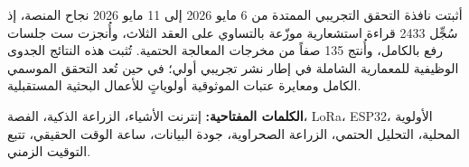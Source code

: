 \begin{Arabic}
أثبتت نافذة التحقق التجريبي الممتدة من 6 مايو 2026 إلى 11 مايو 2026 نجاح
المنصة، إذ سُجِّل 2433 قراءة استشعارية موزّعة بالتساوي على العقد الثلاث، وأُنجزت
ست جلسات رفع بالكامل، وأُنتج 135 صفاً من مخرجات المعالجة الحتمية. تُثبت هذه
النتائج الجدوى الوظيفية للمعمارية الشاملة في إطار نشر تجريبي أولي؛ في حين تُعد
التحقق الموسمي الكامل ومعايرة عتبات الموثوقية أولوياتٍ للأعمال البحثية المستقبلية.

\vspace{0.8em}
\noindent\textbf{الكلمات المفتاحية:}
إنترنت الأشياء، الزراعة الذكية، الفصة، LoRa، ESP32، الأولوية المحلية،
التحليل الحتمي، الزراعة الصحراوية، جودة البيانات، ساعة الوقت الحقيقي،
تتبع التوقيت الزمني.

\end{Arabic}

